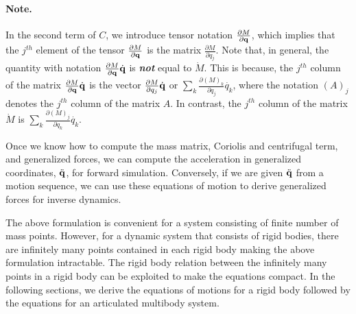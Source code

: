 \paragraph{Note.} In the second term of $C$, we introduce tensor notation $\frac{\partial M}{\partial \mathbf{q}}$, which implies that the $j^{th}$ element of the tensor $\frac{\partial M}{\partial \mathbf{q}}$ is the matrix $\frac{\partial M}{\partial {q}_j}$. Note that, in general, the quantity with notation $\frac{\partial M}{\partial \mathbf{q}} \dot{\mathbf{q}}$ is \textbf{\emph{not}} equal to $\dot{M}$. This is because, the $j^{th}$ column of the matrix $\frac{\partial M}{\partial \mathbf{q}} \dot{\mathbf{q}}$ is the vector $\frac{\partial M}{\partial q_j} \dot{\mathbf{q}}$ or $\sum_k \frac{\partial (M)_k}{\partial q_j} \dot{{q}_k}$, where the notation $(A)_j$ denotes the $j^{th}$ column of the matrix $A$. In contrast, the $j^{th}$ column of the matrix $\dot{M}$ is $\sum_k \frac{\partial (M)_j}{\partial q_k} \dot{{q}_k}$.

Once we know how to compute the mass matrix, Coriolis and centrifugal
term, and generalized forces, we can compute the acceleration in
generalized coordinates, $\ddot{\mathbf{q}}$, for forward
simulation. Conversely, if we are given $\ddot{\mathbf{q}}$ from a motion
sequence, we can use these equations of motion to derive generalized
forces for inverse dynamics. 

The above formulation is convenient for a system consisting of finite number of mass points. However, for a dynamic system that consists of rigid bodies, there are infinitely many points contained in each rigid body making the above formulation intractable. The rigid body relation between the infinitely many points in a rigid body can be exploited to make the equations compact. In the following sections, we derive the equations of motions for a rigid body followed by the equations for an articulated multibody system.

\newpage
